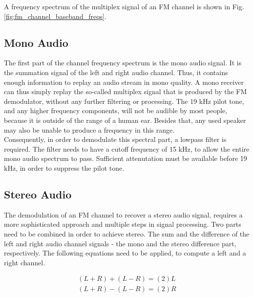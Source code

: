A frequency spectrum of the multiplex signal of an FM channel is shown in Fig.\ref{fig:fm_channel_baseband_freqs}.

\subsection{Mono Audio}
\label{subsec:demod_mono}

The first part of the channel frequency spectrum is the mono audio signal.
It is the summation signal of the left and right audio channel.
Thus, it contains enough information to replay an audio stream in mono quality.
A mono receiver can thus simply replay the so-called multiplex signal that is produced by the FM demodulator, without any further filtering or processing.
The 19 kHz pilot tone, and any higher frequency components, will not be audible by most people, because it is outside of the range of a human ear.
Besides that, any used speaker may also be unable to produce a frequency in this range.\\

Consequently, in order to demodulate this spectral part, a lowpass filter is required.
The filter needs to have a cutoff frequency of 15 kHz, to allow the entire mono audio spectrum to pass.
Sufficient attenutation must be available before 19 kHz, in order to suppress the pilot tone.

\subsection{Stereo Audio}

The demodulation of an FM channel to recover a stereo audio signal, requires a more sophisticated approach and multiple steps in signal processing.
Two parts need to be combined in order to achieve stereo.
The sum and the difference of the left and right audio channel signals - the mono and the stereo difference part, respectively.
The following equations need to be applied, to compute a left and a right channel.

\begin{equation}
  \begin{split}
    (L+R) + (L-R) = (2)L \\
    (L+R) - (L-R) = (2)R
    \label{equ_stereo_from_sum_diff}
  \end{split}
\end{equation}


